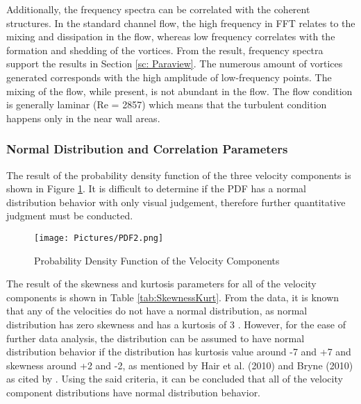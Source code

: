 \documentclass[11pt]{article}
\begin{document}
\noindent Additionally, the frequency spectra can be correlated with the coherent structures. In the standard channel flow, the high frequency in FFT relates to the mixing and dissipation in the flow, whereas low frequency correlates with the formation and shedding of the vortices. From the result, frequency spectra support the results in Section \ref{sc: Paraview}. The numerous amount of vortices generated corresponds with the high amplitude of low-frequency points. The mixing of the flow, while present, is not abundant in the flow. The flow condition is generally laminar (Re = 2857) which means that the turbulent condition happens only in the near wall areas.



\subsubsection{Normal Distribution and Correlation Parameters}
The result of the probability density function of the three velocity components is shown in Figure \ref{fig:PDF}. It is difficult to determine if the PDF has a normal distribution behavior with only visual judgement, therefore further quantitative judgment must be conducted.
\begin{figure}[ht]
    \centering
    \texttt{[image: Pictures/PDF2.png]}
    \caption{Probability Density Function of the Velocity Components}
    \label{fig:PDF}
\end{figure}
\newpage
\noindent The result of the skewness and kurtosis parameters for all of the velocity components is shown in Table \ref{tab:SkewnessKurt}. From the data, it is known that any of the velocities do not have a normal distribution, as normal distribution has zero skewness \citep{Turney2023} and has a kurtosis of 3 \citep{Zach2022}. However, for the ease of further data analysis, the distribution can be assumed to have normal distribution behavior if the distribution has kurtosis value around -7 and +7 and skewness around +2 and -2, as mentioned by Hair et al. (2010) and Bryne (2010) as cited by \citet{Watson2018}. Using the said criteria, it can be concluded that all of the velocity component distributions have normal distribution behavior.
\end{document}
